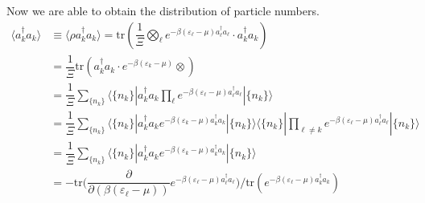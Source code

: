 \documentclass[b5paper,10pt,UTF8]{book}
\numberwithin{equation}{section}
\begin{document}
		Now we are able to obtain the distribution of particle numbers.
		\begin{align*}
			\langle a_k^\dagger a_k\rangle&\equiv\langle\rho a_k^\dagger a_k\rangle=\mathrm{tr}\left(\dfrac{1}{\varXi}\bigotimes_\ell e^{-\beta(\varepsilon_\ell-\mu)a_\ell^\dagger a_\ell}\cdot a_k^\dagger a_k\right)\\
			&=\dfrac{1}{\varXi}\mathrm{tr}\left(a_k^\dagger a_k\cdot e^{-\beta(\varepsilon_k-\mu)}\otimes\right)\\
			&=\dfrac{1}{\varXi}\sum_{\{n_k\}}\langle\{n_k\}|a_k^\dagger a_k\prod_\ell e^{-\beta(\varepsilon_\ell-\mu)a_\ell^\dagger a_\ell}|\{n_k\}\rangle\\
			&=\dfrac{1}{\varXi}\sum_{\{n_k\}}\langle\{n_k\}|a_k^\dagger a_k e^{-\beta(\varepsilon_k-\mu)a_k^\dagger a_k}|\{n_k\}\rangle\langle\{n_k\}|\prod_{\ell\neq k} e^{-\beta(\varepsilon_\ell-\mu)a_\ell^\dagger a_\ell}|\{n_k\}\rangle\\
			&=\dfrac{1}{\varXi}\sum_{\{n_k\}}\langle\{n_k\}|a_k^\dagger a_k e^{-\beta(\varepsilon_k-\mu)a_k^\dagger a_k}|\{n_k\}\rangle\\
			&=-\mathrm{tr}\bigg(\dfrac{\partial}{\partial(\beta(\varepsilon_\ell-\mu))}e^{-\beta(\varepsilon_\ell-\mu)a_\ell^\dagger a_\ell}\bigg) \bigg/\mathrm{tr}\left(e^{-\beta(\varepsilon_\ell-\mu)a_k^\dagger a_k}\right)
		\end{align*}
\end{document}
